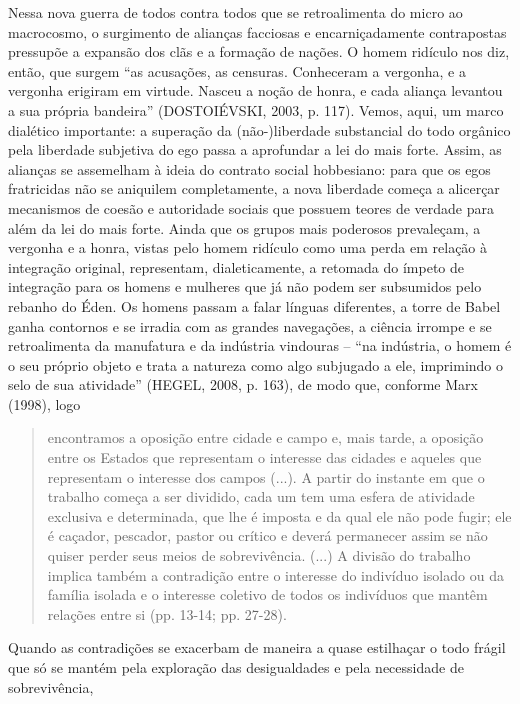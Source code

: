 Nessa nova guerra de todos contra todos que se retroalimenta do micro ao
macrocosmo, o surgimento de alianças facciosas e encarniçadamente
contrapostas pressupõe a expansão dos clãs e a formação de nações. O
homem ridículo nos diz, então, que surgem ``as acusações, as censuras.
Conheceram a vergonha, e a vergonha erigiram em virtude. Nasceu a noção
de honra, e cada aliança levantou a sua própria bandeira'' (DOSTOIÉVSKI,
2003, p. 117). Vemos, aqui, um marco dialético importante: a superação
da (não-)liberdade substancial do todo orgânico pela liberdade subjetiva
do ego passa a aprofundar a lei do mais forte. Assim, as alianças se
assemelham à ideia do contrato social hobbesiano: para que os egos
fratricidas não se aniquilem completamente, a nova liberdade começa a
alicerçar mecanismos de coesão e autoridade sociais que possuem teores
de verdade para além da lei do mais forte. Ainda que os grupos mais
poderosos prevaleçam, a vergonha e a honra, vistas pelo homem ridículo
como uma perda em relação à integração original, representam,
dialeticamente, a retomada do ímpeto de integração para os homens e
mulheres que já não podem ser subsumidos pelo rebanho do Éden. Os homens
passam a falar línguas diferentes, a torre de Babel ganha contornos e se
irradia com as grandes navegações, a ciência irrompe e se retroalimenta
da manufatura e da indústria vindouras -- ``na indústria, o homem é o
seu próprio objeto e trata a natureza como algo subjugado a ele,
imprimindo o selo de sua atividade'' (HEGEL, 2008, p. 163), de modo que,
conforme Marx (1998), logo

\begin{quote}
encontramos a oposição entre cidade e campo e, mais tarde, a oposição
entre os Estados que representam o interesse das cidades e aqueles que
representam o interesse dos campos (...). A partir do instante em que o
trabalho começa a ser dividido, cada um tem uma esfera de atividade
exclusiva e determinada, que lhe é imposta e da qual ele não pode fugir;
ele é caçador, pescador, pastor ou crítico e deverá permanecer assim se
não quiser perder seus meios de sobrevivência. (...) A divisão do
trabalho implica também a contradição entre o interesse do indivíduo
isolado ou da família isolada e o interesse coletivo de todos os
indivíduos que mantêm relações entre si (pp. 13-14; pp. 27-28).
\end{quote}

Quando as contradições se exacerbam de maneira a quase estilhaçar o todo
frágil que só se mantém pela exploração das desigualdades e pela
necessidade de sobrevivência,

